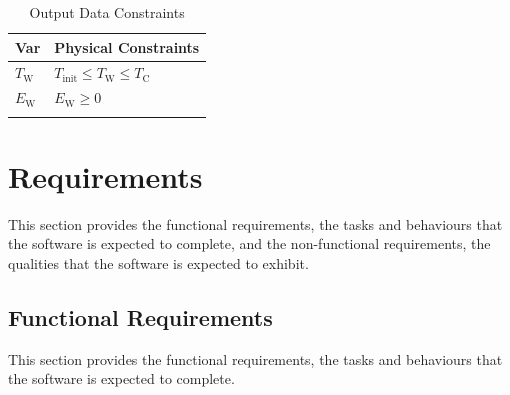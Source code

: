 \documentclass[12pt]{article}
\begin{document}
\begin{longtable}{l l}
\toprule
\textbf{Var} & \textbf{Physical Constraints}
\\
\midrule
\endhead
${T_{\text{W}}}$ & ${T_{\text{init}}}\leq{}{T_{\text{W}}}\leq{}{T_{\text{C}}}$
\\
${E_{\text{W}}}$ & ${E_{\text{W}}}\geq{}0$
\\
\bottomrule
\caption{Output Data Constraints}
\label{Table:OutDataConstraints}
\end{longtable}
\section{Requirements}
\label{Sec:Requirements}
This section provides the functional requirements, the tasks and behaviours that the software is expected to complete, and the non-functional requirements, the qualities that the software is expected to exhibit.

\subsection{Functional Requirements}
\label{Sec:FRs}
This section provides the functional requirements, the tasks and behaviours that the software is expected to complete.
\end{document}
